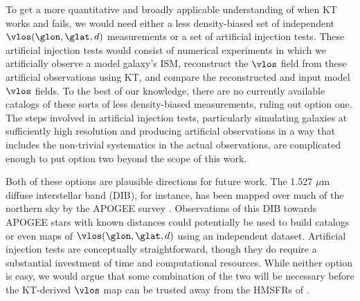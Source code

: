 To get a more quantitative and broadly applicable understanding of when KT works and fails, we would need either a less density-biased set of independent $\vlos(\glon, \glat, d)$ measurements or a set of artificial injection tests. 
These artificial injection tests would consist of numerical experiments in which we artificially observe a model galaxy's ISM, reconstruct the $\vlos$ field from these artificial observations using KT, and compare the reconstructed and input model $\vlos$ fields. 
To the best of our knowledge, there are no currently available catalogs of these sorts of less density-biased measurements, ruling out option one.
The steps involved in artificial injection tests, particularly simulating galaxies at sufficiently high resolution and producing artificial observations in a way that includes the non-trivial systematics in the actual observations, are complicated enough to put option two beyond the scope of this work.

Both of these options are plausible directions for future work. 
The 1.527 $\mu$m diffuse interstellar band (DIB), for instance, has been mapped over much of the northern sky by the APOGEE survey \citep{2015ApJ...798...35Z}. 
Observations of this DIB towards APOGEE stars with known distances could potentially be used to build catalogs or even maps of $\vlos(\glon, \glat, d)$ using an independent dataset. 
Artificial injection tests are conceptually straightforward, though they do require a substantial investment of time and computational resources.
While neither option is easy, we would argue that some combination of the two will be necessary before the KT-derived $\vlos$ map can be trusted away from the HMSFRs of \Reid{}.
